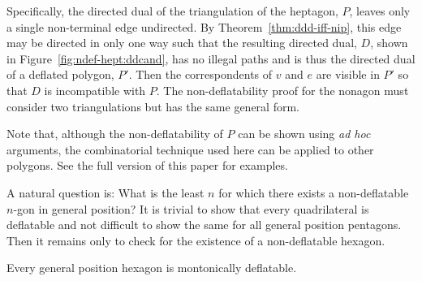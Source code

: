 \documentclass{patmorin}
\begin{document}
Specifically, the directed dual of the triangulation of the heptagon,
$P$, leaves only a single non-terminal edge undirected.  By
Theorem~\ref{thm:ddd-iff-nip}, this edge may be directed in only one
way such that the resulting directed dual, $D$, shown in
Figure~\ref{fig:ndef-hept:ddcand}, has no illegal paths and is thus
the directed dual of a deflated polygon, $P'$.  Then the
correspondents of $v$ and $e$ are visible in $P'$ so that $D$ is
incompatible with $P$.  The non-deflatability proof for the nonagon
must consider two triangulations but has the same general form.

\else %

Note that, although the non-deflatability of $P$ can be shown using
\emph{ad hoc} arguments, the combinatorial technique used here can be
applied to other polygons.  See the full version of this
paper \cite{Bose12} for examples.

\fi

\iffullversion

A natural question is: What is the least $n$ for which there exists a
non-deflatable $n$-gon in general position?  It is trivial to show
that every quadrilateral is deflatable and not difficult to show the
same for all general position pentagons.  Then it remains only to
check for the existence of a non-deflatable hexagon.

\begin{theorem}\label{thm:hex-deflate}
  Every general position hexagon is montonically deflatable.
\end{theorem}
\end{document}
